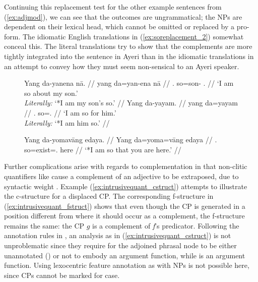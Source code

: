 Continuing this replacement test for the other example sentences from
(\ref{ex:adjmod}), we can see that the outcomes are ungrammatical; the NPs are
dependent on their lexical head, which cannot be omitted or replaced by a
pro-form. The idiomatic English translations in (\ref{ex:soreplacement_2})
somewhat conceal this. The literal translations try to show that the
complements are more tightly integrated into the sentence in Ayeri than in the
idiomatic translations in an attempt to convey how they must seem non-sensical
to an Ayeri speaker.

\begin{figure}
\pex\label{ex:soreplacement_2}
\a\label{ex:soreplacement_2_1}\ljudge*\begingl
	\gla Yang da-yanena nā. //
	\glb yang da=yan-ena nā //
	\glc \Fsg{}.\Aarg{} so=son-\Gen{} \Fsg{}.\Gen{} //
	\glft `I am so about my son.'\\
		\textit{Literally:} `*I am my son's so.' //
\endgl
\a\label{ex:soreplacement_2_2}\ljudge*\begingl
	\gla Yang da-yayam. //
	\glb yang da=yayam //
	\glc \Fsg{}.\Aarg{} so=\TsgM{}.\Dat{} //
	\glft `I am so for him.' \\
		\textit{Literally:} `*I am him so.' //
\endgl

\a\label{ex:soreplacement_2_3}\ljudge*\begingl
	\gla Yang da-yomavāng edaya. //
	\glb Yang da=yoma=vāng edaya //
	\glc \Fsg{}.\Aarg{} so=exist=\Second{}.\Aarg{} here //
	\glft `*I am so that you are here.' //
\endgl
\xe
\end{figure}


Further complications arise with regards to complementation in that non-clitic
quantifiers like  cause a
complement of an adjective to be extraposed, due to
syntactic weight \citep{wechsler2009}. Example (\ref{ex:intrusivequant_cstruct})
attempts to illustrate the c-structure for a displaced CP. The corresponding f-structure in
(\ref{ex:intrusivequant_fstruct}) shows that even though the CP is generated in
a position different from where it should occur as a complement, the f-structure
remains the same: the CP $g$ is a complement of \textit{f}'s predicator.
Following the annotation rules in \citet[107]{bresnan2016}, an analysis as in
(\ref{ex:intrusivequant_cstruct}) is not unproblematic since they require for
the adjoined phrasal node to be either unannotated (\updown{}) or not to embody
an argument function, while \Comp{} is an argument function. Using lexocentric
feature annotation as with NPs is not possible here, since CPs cannot be marked for case.

